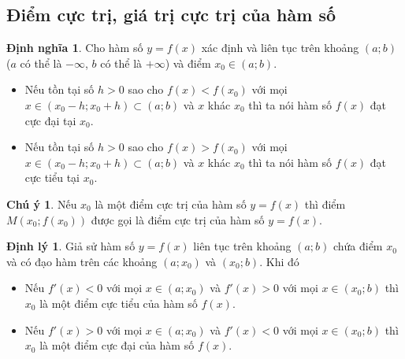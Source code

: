 \documentclass[12pt,a4paper,oneside]{book}
\theoremstyle{theorem}
\theoremstyle{definition}
\newtheorem{dn}[theorem2]{Định nghĩa}
\newtheorem{dl}[theorem2]{Định lý}
\newtheorem{cy}[theorem2]{Chú ý}
\begin{document}
    \subsection{Điểm cực trị, giá trị cực trị của hàm số}
        \begin{dn}
            Cho hàm số $y=f(x)$ xác định và liên tục trên khoảng $(a;b)$ ($a$ có thể là $- \infty$, $b$ có thể là $+ \infty$) và điểm $x_0 \in (a;b)$.
        \end{dn}
        \begin{itemize}
            \item[(i)] Nếu tồn tại số $h>0$ sao cho $f(x)<f(x_0)$ với mọi $x \in (x_0-h;x_0+h) \subset (a;b)$ và $x$ khác $x_0$ thì ta nói hàm số $f(x)$ đạt cực đại tại $x_0$.
            \item[(ii)] Nếu tồn tại số $h>0$ sao cho $f(x)>f(x_0)$ với mọi $x \in (x_0-h;x_0+h) \subset (a;b)$ và $x$ khác $x_0$ thì ta nói hàm số $f(x)$ đạt cực tiểu tại $x_0$.
        \end{itemize}
        \begin{cy}
            Nếu $x_0$ là một điểm cực trị của hàm số $y=f(x)$ thì điểm $M(x_0;f(x_0))$ được gọi là điểm cực trị của hàm số $y=f(x)$.
        \end{cy}
        \begin{dl}
            Giả sử hàm số $y=f(x)$ liên tục trên khoảng $(a;b)$ chứa điểm $x_0$ và có đạo hàm trên các khoảng $(a;x_0)$ và $(x_0;b)$. Khi đó
        \end{dl}
        \begin{itemize}
            \item[(i)] Nếu $f'(x)<0$ với mọi $x \in (a;x_0)$ và $f'(x)>0$ với mọi $x \in (x_0;b)$ thì $x_0$ là một điểm cực tiểu của hàm số $f(x)$.
            \item[(ii)] Nếu $f'(x)>0$ với mọi $x \in (a;x_0)$ và $f'(x)<0$ với mọi $x \in (x_0;b)$ thì $x_0$ là một điểm cực đại của hàm số $f(x)$.
        \end{itemize}  
\end{document}
